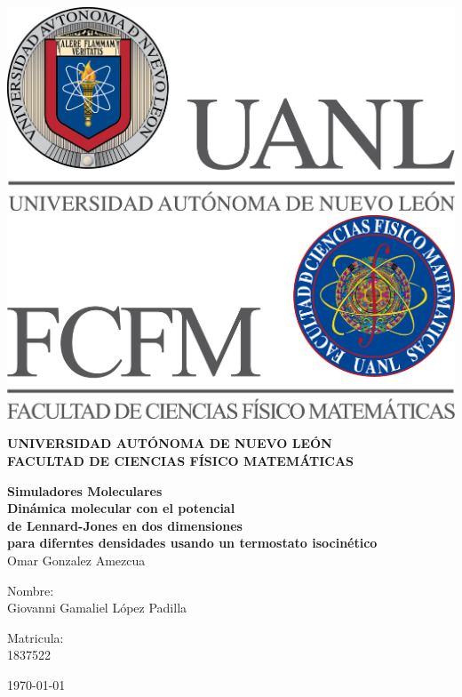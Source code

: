 \documentclass[reprint,amsmath,amssymb,aps,]{revtex4-2}
\begin{document}
\begin{titlepage}
\begin{center}
\includegraphics[scale=0.40]{Images/uanl.png} 
\hspace{2.5cm}
\includegraphics[scale=0.40]{Images/fcfm.png}
\end{center}
\vspace{2cm}
\begin{center}
\textbf{
UNIVERSIDAD AUTÓNOMA DE NUEVO LEÓN\\
FACULTAD DE CIENCIAS
FÍSICO MATEMÁTICAS}\\
\vspace*{2cm}
\begin{large}
\vspace{1cm}
\textbf{Simuladores Moleculares\vspace{0.5cm}\\
Dinámica molecular con el potencial \\ de Lennard-Jones en dos dimensiones\\ para diferntes densidades usando un termostato isocinético}\\
Omar Gonzalez Amezcua\\
\end{large}
\vspace{3.5cm}
\begin{minipage}{0.6\linewidth}
\vspace{0.5cm}
\changefontsizes{14pt}
Nombre:\\
Giovanni Gamaliel López Padilla\\
\end{minipage}
\begin{minipage}{0.2\linewidth}
\changefontsizes{14pt}
Matricula:\\
1837522
\end{minipage}
\end{center}
\vspace{4cm}
\begin{flushright}
\today
\end{flushright}
\pagebreak
\end{titlepage}
\end{document}
